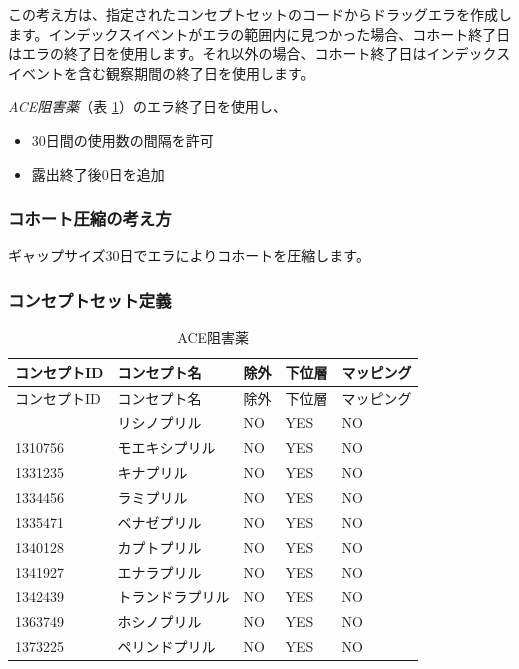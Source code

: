 \documentclass[
  11pt]{book}
\providecommand{\tightlist}{%
  \setlength{\itemsep}{0pt}\setlength{\parskip}{0pt}}
\theoremstyle{definition}
\theoremstyle{definition}
\theoremstyle{definition}
\theoremstyle{definition}
\theoremstyle{remark}
\begin{document}
この考え方は、指定されたコンセプトセットのコードからドラッグエラを作成します。インデックスイベントがエラの範囲内に見つかった場合、コホート終了日はエラの終了日を使用します。それ以外の場合、コホート終了日はインデックスイベントを含む観察期間の終了日を使用します。

\emph{ACE阻害薬}（表 \ref{tab:ACEiUseACE}）のエラ終了日を使用し、

\begin{itemize}
\tightlist
\item
  30日間の使用数の間隔を許可
\item
  露出終了後0日を追加
\end{itemize}

\subsubsection*{コホート圧縮の考え方}\label{ux30b3ux30dbux30fcux30c8ux5727ux7e2eux306eux8003ux3048ux65b9-2}

ギャップサイズ30日でエラによりコホートを圧縮します。

\subsubsection*{コンセプトセット定義}\label{ux30b3ux30f3ux30bbux30d7ux30c8ux30bbux30c3ux30c8ux5b9aux7fa9-4}

\begin{longtable}[]{@{}lllll@{}}
\caption{\label{tab:ACEiUseACE} ACE阻害薬}\tabularnewline
\toprule\noalign{}
コンセプトID & コンセプト名 & 除外 & 下位層 & マッピング \\
\midrule\noalign{}
\endfirsthead
\toprule\noalign{}
コンセプトID & コンセプト名 & 除外 & 下位層 & マッピング \\
\midrule\noalign{}
\endhead
\bottomrule\noalign{}
\endlastfoot
1308216 & リシノプリル & NO & YES & NO \\
1310756 & モエキシプリル & NO & YES & NO \\
1331235 & キナプリル & NO & YES & NO \\
1334456 & ラミプリル & NO & YES & NO \\
1335471 & ベナゼプリル & NO & YES & NO \\
1340128 & カプトプリル & NO & YES & NO \\
1341927 & エナラプリル & NO & YES & NO \\
1342439 & トランドラプリル & NO & YES & NO \\
1363749 & ホシノプリル & NO & YES & NO \\
1373225 & ペリンドプリル & NO & YES & NO \\
\end{longtable}
\end{document}
